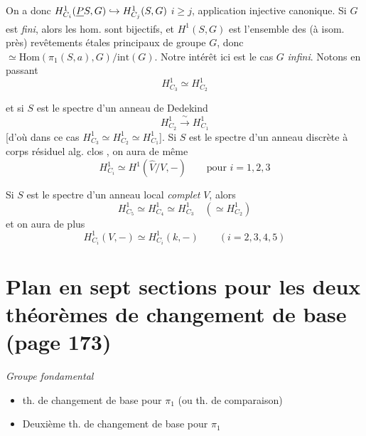 \documentclass[11pt,a4paper]{article}
\begin{document}
On a donc $H^1_{C_i}(\struck{P}S, G) \hookrightarrow H^1_{C_j}(S,G)$  $i \geqslant j$,
application injective canonique. Si $G$ est \emph{fini}, alors  les
hom. sont bijectifs, et $H^1(S,G)$ est l'ensemble des 
(à isom. près)  revêtements étales principaux de groupe $G$,
donc $\simeq \mathrm{Hom}(\pi_1(S,a), G)/\mathrm{int}(G)$. Notre
intérêt ici est  le cas $G$ \emph{infini}.
Notons en passant
\[
  H^1_{C_3} \simeq H^1_{C_2}
\]


et si $S$ est le spectre d'un anneau de Dedekind
\[
  H^1_{C_2} \xrightarrow{\ \sim\ } H^1_{C_1}
\]
[d'où dans ce cas $H^1_{C_3} \simeq H^1_{C_2} \simeq H^1_{C_1}$]. Si $S$ est le
spectre d'un anneau   discrète à
corps résiduel alg. clos , on aura de même %
\[
  H^1_{C_i} \simeq H^1(\widehat{V}/V, -) \qquad \text{pour } i = 1,2,3
\]

Si $S$ est le spectre d'un anneau local \emph{complet} $V$, alors
\struck{\ill{}}
\[
  H^1_{C_5} \simeq H^1_{C_4} \simeq H^1_{C_3} \quad (\simeq H^1_{C_2})
\]
et on aura de plus
\[
  H^1_{C_i}(V,-) \simeq H^1_{C_i}(k, -) \qquad (i = 2,3,4,5)
\]

\section*{Plan en sept sections pour les deux théorèmes de changement de base (page 173)}



\emph{Groupe fondamental}

\begin{itemize}
\item[I]   th. de
changement de base pour $\pi_1$ (ou th. de comparaison)
\item[II] Deuxième th. de changement de base pour $\pi_1$
\end{itemize}
\end{document}
